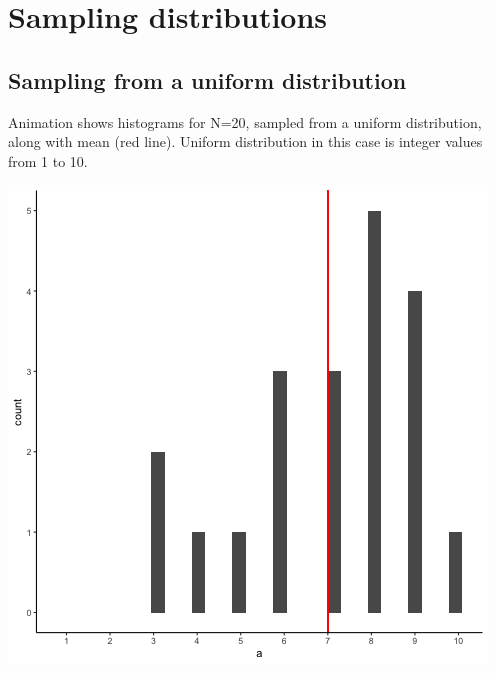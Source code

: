 \documentclass[]{book}
\begin{document}
\hypertarget{sampling-distributions}{%
\section{Sampling distributions}\label{sampling-distributions}}

\hypertarget{sampling-from-a-uniform-distribution}{%
\subsection{Sampling from a uniform distribution}\label{sampling-from-a-uniform-distribution}}

Animation shows histograms for N=20, sampled from a uniform distribution, along with mean (red line). Uniform distribution in this case is integer values from 1 to 10.

\includegraphics{gifs/sampleHistUnif-1.gif}
\end{document}

